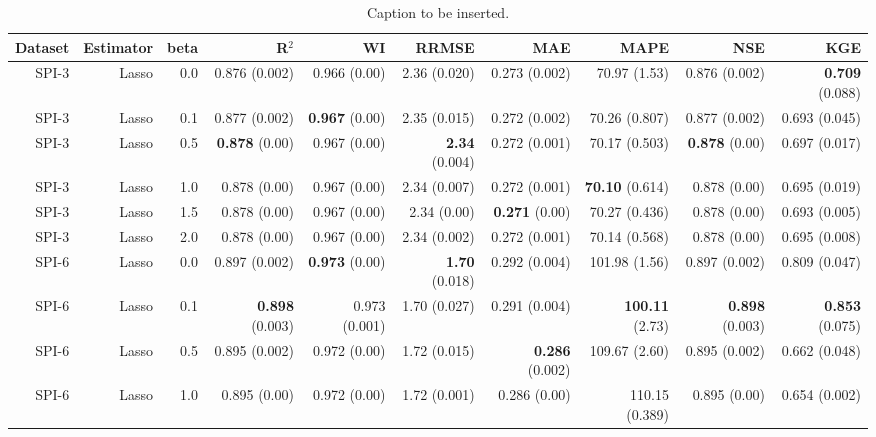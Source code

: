 \begin{table}
\centering
\caption{Caption to be inserted.}
\label{sp__comparison_datasets_table}
\begin{tabular}{rrrrrrrrrr}
\toprule
Dataset & Estimator &  beta &                R$^2$ &                  WI &               RRMSE &                  MAE &                  MAPE &                  NSE &                  KGE \\
\midrule
  SPI-3 &     Lasso &   0.0 &        0.876 (0.002) &        0.966 (0.00) &        2.36 (0.020) &        0.273 (0.002) &          70.97 (1.53) &        0.876 (0.002) & { \bf 0.709} (0.088) \\
  SPI-3 &     Lasso &   0.1 &        0.877 (0.002) & { \bf 0.967} (0.00) &        2.35 (0.015) &        0.272 (0.002) &         70.26 (0.807) &        0.877 (0.002) &        0.693 (0.045) \\
  SPI-3 &     Lasso &   0.5 &  { \bf 0.878} (0.00) &        0.967 (0.00) & { \bf 2.34} (0.004) &        0.272 (0.001) &         70.17 (0.503) &  { \bf 0.878} (0.00) &        0.697 (0.017) \\
  SPI-3 &     Lasso &   1.0 &         0.878 (0.00) &        0.967 (0.00) &        2.34 (0.007) &        0.272 (0.001) &  { \bf 70.10} (0.614) &         0.878 (0.00) &        0.695 (0.019) \\
  SPI-3 &     Lasso &   1.5 &         0.878 (0.00) &        0.967 (0.00) &         2.34 (0.00) &  { \bf 0.271} (0.00) &         70.27 (0.436) &         0.878 (0.00) &        0.693 (0.005) \\
  SPI-3 &     Lasso &   2.0 &         0.878 (0.00) &        0.967 (0.00) &        2.34 (0.002) &        0.272 (0.001) &         70.14 (0.568) &         0.878 (0.00) &        0.695 (0.008) \\
  SPI-6 &     Lasso &   0.0 &        0.897 (0.002) & { \bf 0.973} (0.00) & { \bf 1.70} (0.018) &        0.292 (0.004) &         101.98 (1.56) &        0.897 (0.002) &        0.809 (0.047) \\
  SPI-6 &     Lasso &   0.1 & { \bf 0.898} (0.003) &       0.973 (0.001) &        1.70 (0.027) &        0.291 (0.004) &  { \bf 100.11} (2.73) & { \bf 0.898} (0.003) & { \bf 0.853} (0.075) \\
  SPI-6 &     Lasso &   0.5 &        0.895 (0.002) &        0.972 (0.00) &        1.72 (0.015) & { \bf 0.286} (0.002) &         109.67 (2.60) &        0.895 (0.002) &        0.662 (0.048) \\
  SPI-6 &     Lasso &   1.0 &         0.895 (0.00) &        0.972 (0.00) &        1.72 (0.001) &         0.286 (0.00) &        110.15 (0.389) &         0.895 (0.00) &        0.654 (0.002) \\

\end{tabular}
\end{table}
